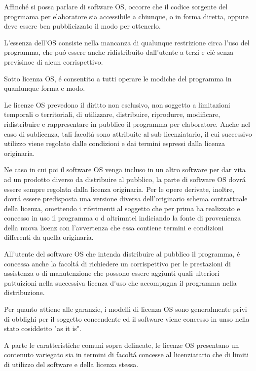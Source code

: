 \documentclass{article}
\begin{document}
Affinch\'e si possa parlare di software OS, occorre che il codice sorgente del progrmama per elaboratore sia accessibile a chiunque, o in forma diretta, oppure deve essere ben pubblicizzato il modo per ottenerlo. 

L'essenza dell'OS consiste nella mancanza di qualunque restrizione circa l'uso del programma, che pu\'o essere anche ridistribuito dall'utente a terzi e ci\'e senza previsinoe di alcun corrispettivo. 

Sotto licenza OS, \'e consentito a tutti operare le modiche del programma in quanlunque forma e modo.

Le licenze OS prevedono il diritto non esclusivo, non soggetto a limitazioni temporali o territoriali, di utilizzare, distribuire, riprodurre, modificare, ridistribuire e rappresentare in pubblico il programma per elaboratore. Anche nel caso di sublicenza, tali facolt\'a sono attribuite al sub licenziatario, il cui successivo utilizzo viene regolato dalle condizioni e dai termini espressi dalla licenza originaria.

Ne caso in cui poi il software OS venga incluso in un altro software per dar vita ad un prodotto diverso da distribuire al pubblico, la parte di software OS dovr\'a essere sempre regolata dalla licenza originaria. Per le opere derivate, inoltre, dovr\'a essere predisposta una versione diversa dell'originario schema contrattuale della licenza, omettendo i riferimenti al soggetto che per prima ha realizzato e concesso in uso il programma o d altrimntei indiciando la fonte di provenienza della nuova licenz con l'avvertenza che essa contiene termini e condizioni differenti da quella originaria.

All'utente del software OS che intenda distribuire al pubblico il programma, \'e concessa anche la facolt\'a di richiedere un corrispettivo per le prestazioni di assistenza o di manutenzione che possono essere aggiunti quali ulteriori pattuizioni nella successiva licenza d'uso che accompagna il programma nella distribuzione. 

Per quanto attiene alle garanzie, i modelli di licenza OS sono generalmente privi di obblighi per il soggetto concendente ed il software viene concesso in unso nella stato cosiddetto "as it is".

A parte le caratteristiche comuni sopra delineate, le licenze OS presentano un contenuto variegato sia in termini di facolt\'a concesse al licenziatario che di limiti di utilizzo del software e della licenza stessa. 
\end{document}
